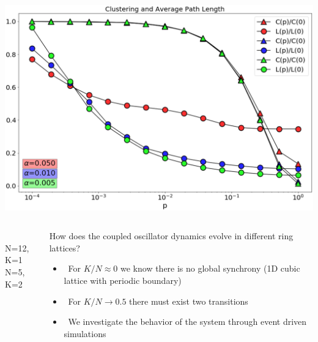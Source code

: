 \documentclass[serif,mathserif]{beamer}
\begin{document}
\begin{frame}
    \centering
    \includegraphics[height=0.85\textheight]{small-world.eps}
\end{frame}

\begin{frame}
    \begin{columns}
        \begin{column}{0.4\textwidth}
            \\
            N=12, K=1
            \\
            N=5, K=2
        \end{column}
        \begin{column}{0.6\textwidth}
            How does the coupled oscillator dynamics evolve in different ring lattices?\\
            \vspace{0.25cm}
            \begin{itemize}
                \vspace{0.25cm}
                \item \ \pause For $K/N \approx 0$ we know there is no global synchrony (1D cubic lattice with periodic boundary)
                \vspace{0.25cm}
                \item \ \pause For $K/N\rightarrow 0.5$ there must exist two transitions
                \vspace{0.25cm}
                \item \ \pause We investigate the behavior of the system through event driven simulations
            \end{itemize}
        \end{column}
    \end{columns}
\end{frame}
\end{document}
